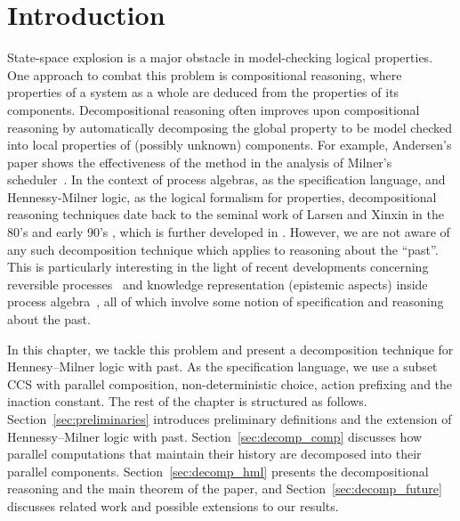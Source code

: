 \section{Introduction}
State-space explosion is a major obstacle in model-checking logical properties.
One approach to combat this problem is compositional reasoning,
where properties of a system as a whole are deduced from the properties of its components.
Decompositional reasoning \cite{Giannakopoulou05,Xie05,Andersen95,LaroussinieL95} 
often improves upon compositional reasoning by
automatically decomposing the global property to be model checked
into local properties of (possibly unknown) components.
For example, Andersen's paper shows the effectiveness of the method in the analysis of Milner's scheduler~\cite{Milner89a}.
In the context of process algebras, as the specification language, and Hennessy-Milner logic, as the logical formalism for properties,
decompositional reasoning techniques date back to the seminal work of Larsen and Xinxin 
in the 80's and early 90's \cite{Larsen91},
which is further developed in \cite{anna87,Simpson04,Fokkink06}.
However, we are not aware of any such decomposition technique which applies to reasoning about the ``past''.
This is particularly interesting in the light of recent developments concerning reversible processes~\cite{Phillips06} and
knowledge representation (epistemic aspects) inside process algebra~\cite{Mousavi07-LPAR},
all of which involve some notion of specification and reasoning about the past.


In this chapter, we tackle this problem and present a decomposition technique for Hennesy--Milner logic with past.
As the specification language, we use a subset CCS with parallel composition, non-deterministic choice, action prefixing
and the inaction constant.
%
The rest of the chapter is structured as follows. Section~\ref{sec:preliminaries}
introduces preliminary definitions and the extension of Hennessy--Milner logic
with past. Section~\ref{sec:decomp_comp} discusses how parallel computations that maintain
their history are decomposed into their parallel components. Section~\ref{sec:decomp_hml}
presents the decompositional reasoning and the main theorem of the paper, and
Section~\ref{sec:decomp_future} discusses related work and possible extensions to our results.

